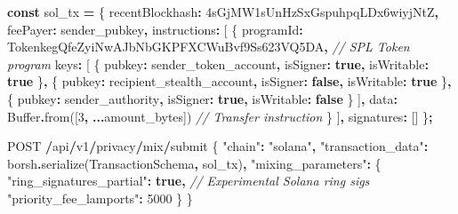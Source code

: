 \documentclass[
  11pt,
]{article}
\newenvironment{Shaded}{\begin{snugshade}}{\end{snugshade}}
\newcommand{\BuiltInTok}[1]{#1}
\newcommand{\CommentTok}[1]{\textcolor[rgb]{0.56,0.35,0.01}{\textit{#1}}}
\newcommand{\DataTypeTok}[1]{\textcolor[rgb]{0.13,0.29,0.53}{#1}}
\newcommand{\DecValTok}[1]{\textcolor[rgb]{0.00,0.00,0.81}{#1}}
\newcommand{\FunctionTok}[1]{\textcolor[rgb]{0.00,0.00,0.00}{#1}}
\newcommand{\KeywordTok}[1]{\textcolor[rgb]{0.13,0.29,0.53}{\textbf{#1}}}
\newcommand{\NormalTok}[1]{#1}
\newcommand{\OperatorTok}[1]{\textcolor[rgb]{0.81,0.36,0.00}{\textbf{#1}}}
\newcommand{\StringTok}[1]{\textcolor[rgb]{0.31,0.60,0.02}{#1}}
\begin{document}
\begin{Shaded}
\begin{Highlighting}[]
\KeywordTok{const}\NormalTok{ sol\_tx }\OperatorTok{=}\NormalTok{ \{}
  \DataTypeTok{recentBlockhash}\OperatorTok{:} \StringTok{\textquotesingle{}4sGjMW1sUnHzSxGspuhpqLDx6wiyjNtZ\textquotesingle{}}\OperatorTok{,}
  \DataTypeTok{feePayer}\OperatorTok{:} \StringTok{\textquotesingle{}sender\_pubkey\textquotesingle{}}\OperatorTok{,}
  \DataTypeTok{instructions}\OperatorTok{:}\NormalTok{ [}
\NormalTok{    \{}
      \DataTypeTok{programId}\OperatorTok{:} \StringTok{\textquotesingle{}TokenkegQfeZyiNwAJbNbGKPFXCWuBvf9Ss623VQ5DA\textquotesingle{}}\OperatorTok{,}  \CommentTok{// SPL Token program}
      \DataTypeTok{keys}\OperatorTok{:}\NormalTok{ [}
\NormalTok{        \{ }\DataTypeTok{pubkey}\OperatorTok{:} \StringTok{\textquotesingle{}sender\_token\_account\textquotesingle{}}\OperatorTok{,} \DataTypeTok{isSigner}\OperatorTok{:} \KeywordTok{true}\OperatorTok{,} \DataTypeTok{isWritable}\OperatorTok{:} \KeywordTok{true}\NormalTok{ \}}\OperatorTok{,}
\NormalTok{        \{ }\DataTypeTok{pubkey}\OperatorTok{:} \StringTok{\textquotesingle{}recipient\_stealth\_account\textquotesingle{}}\OperatorTok{,} \DataTypeTok{isSigner}\OperatorTok{:} \KeywordTok{false}\OperatorTok{,} \DataTypeTok{isWritable}\OperatorTok{:} \KeywordTok{true}\NormalTok{ \}}\OperatorTok{,}
\NormalTok{        \{ }\DataTypeTok{pubkey}\OperatorTok{:} \StringTok{\textquotesingle{}sender\_authority\textquotesingle{}}\OperatorTok{,} \DataTypeTok{isSigner}\OperatorTok{:} \KeywordTok{true}\OperatorTok{,} \DataTypeTok{isWritable}\OperatorTok{:} \KeywordTok{false}\NormalTok{ \}}
\NormalTok{      ]}\OperatorTok{,}
      \DataTypeTok{data}\OperatorTok{:} \BuiltInTok{Buffer}\OperatorTok{.}\FunctionTok{from}\NormalTok{([}\DecValTok{3}\OperatorTok{,} \OperatorTok{...}\NormalTok{amount\_bytes])  }\CommentTok{// Transfer instruction}
\NormalTok{    \}}
\NormalTok{  ]}\OperatorTok{,}
  \DataTypeTok{signatures}\OperatorTok{:}\NormalTok{ []}
\NormalTok{\}}\OperatorTok{;}

\NormalTok{POST }\OperatorTok{/}\NormalTok{api}\OperatorTok{/}\NormalTok{v1}\OperatorTok{/}\NormalTok{privacy}\OperatorTok{/}\NormalTok{mix}\OperatorTok{/}\NormalTok{submit}
\NormalTok{\{}
  \StringTok{"chain"}\OperatorTok{:} \StringTok{"solana"}\OperatorTok{,}
  \StringTok{"transaction\_data"}\OperatorTok{:}\NormalTok{ borsh}\OperatorTok{.}\FunctionTok{serialize}\NormalTok{(TransactionSchema}\OperatorTok{,}\NormalTok{ sol\_tx)}\OperatorTok{,}
  \StringTok{"mixing\_parameters"}\OperatorTok{:}\NormalTok{ \{}
    \StringTok{"ring\_signatures\_partial"}\OperatorTok{:} \KeywordTok{true}\OperatorTok{,}  \CommentTok{// Experimental Solana ring sigs}
    \StringTok{"priority\_fee\_lamports"}\OperatorTok{:} \DecValTok{5000}
\NormalTok{  \}}
\NormalTok{\}}
\end{Highlighting}
\end{Shaded}
\end{document}
